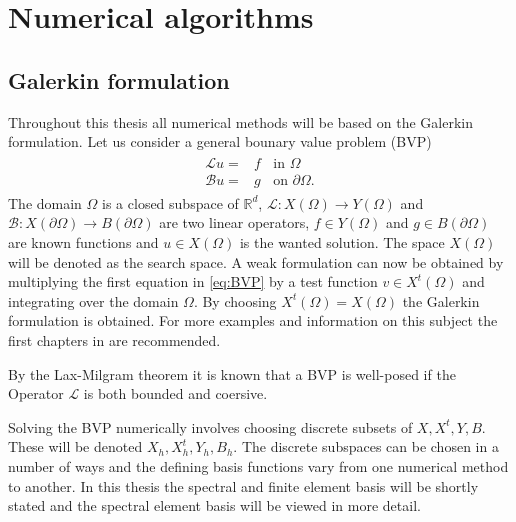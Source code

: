 
\chapter{Numerical algorithms} %

\label{theory} %



\section{Galerkin formulation}
Throughout this thesis all numerical methods will be based on the Galerkin formulation. Let us consider a general bounary value problem (BVP)
\begin{align}
	\begin{split}
	\mathcal{L}u =& f \;\; \text{ in } \Omega\\
	\mathcal{B}u =& g \;\; \text{ on } \partial\Omega.
	\end{split}
	\label{eq:BVP}
\end{align}
The domain $\Omega$ is a closed subspace of $\mathbb{R}^d$, $\mathcal{L}: X(\Omega)\rightarrow Y(\Omega)$ and $\mathcal{B}: X(\partial\Omega)\rightarrow B(\partial\Omega)$ are two linear operators,
$f\in Y(\Omega)$ and $g\in B(\partial\Omega)$ are known functions and $u \in X(\Omega)$ is the wanted solution. 
The space $X(\Omega)$ will be denoted as the search space. A weak formulation can now be obtained by multiplying the first equation in \ref{eq:BVP} 
by a test function $v \in X^t(\Omega)$ and integrating over the domain $\Omega$. By choosing $X^t(\Omega) = X(\Omega)$ the Galerkin formulation is obtained.
For more examples and information on this subject the first chapters in \cite{Quarteroni} are recommended. 

By the Lax-Milgram theorem it is known that a BVP is well-posed if the Operator $\mathcal{L}$ is both bounded and coersive.   

Solving the BVP numerically involves choosing discrete subsets of $X,X^t,Y,B$. These will be denoted $X_h,X_h^t,Y_h,B_h$.
The discrete subspaces can be chosen in a number of ways and the defining basis functions vary from one numerical method to another. 
In this thesis the spectral and finite element basis will be shortly stated and the spectral element basis will be viewed in more detail.


